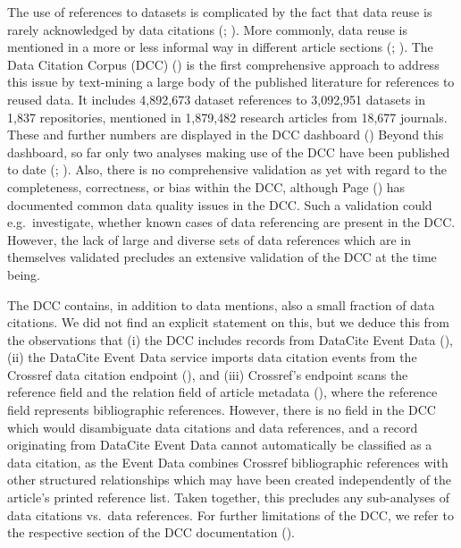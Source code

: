 \documentclass[
  letterpaper,
  DIV=11,
  numbers=noendperiod]{scrartcl}
\begin{document}
The use of references to datasets is complicated by the fact that data
reuse is rarely acknowledged by data citations
(;
). More commonly, data
reuse is mentioned in a more or less informal way in different article
sections (;
). The Data Citation Corpus
(DCC) () is
the first comprehensive approach to address this issue by text-mining a
large body of the published literature for references to reused data. It
includes 4,892,673 dataset references to 3,092,951 datasets in 1,837
repositories, mentioned in 1,879,482 research articles from 18,677
journals. These and further numbers are displayed in the DCC dashboard
() Beyond this dashboard, so far only two analyses
making use of the DCC have been published to date
(;
). Also,
there is no comprehensive validation as yet with regard to the
completeness, correctness, or bias within the DCC, although Page
() has documented common data quality
issues in the DCC. Such a validation could e.g.~investigate, whether
known cases of data referencing are present in the DCC. However, the
lack of large and diverse sets of data references which are in
themselves validated precludes an extensive validation of the DCC at the
time being.

The DCC contains, in addition to data mentions, also a small fraction of
data citations. We did not find an explicit statement on this, but we
deduce this from the observations that (i) the DCC includes records from
DataCite Event Data (), (ii) the DataCite Event Data service imports data
citation events from the Crossref data citation endpoint
(), and (iii)
Crossref's endpoint scans the reference field and the relation field of
article metadata (), where
the reference field represents bibliographic references. However, there
is no field in the DCC which would disambiguate data citations and data
references, and a record originating from DataCite Event Data cannot
automatically be classified as a data citation, as the Event Data
combines Crossref bibliographic references with other structured
relationships which may have been created independently of the article's
printed reference list. Taken together, this precludes any sub-analyses
of data citations vs.~data references. For further limitations of the
DCC, we refer to the respective section of the DCC documentation
().
\end{document}
